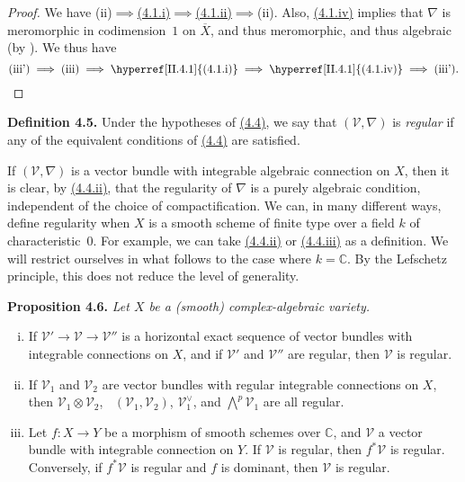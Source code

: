 \documentclass{report}
\newenvironment{itenv}[1]
  {\phantomsection\par\medskip\noindent\textbf{#1.}\itshape}
  {\par\medskip}
\newenvironment{rmenv}[1]
  {\phantomsection\par\medskip\noindent\textbf{#1.}\rmfamily}
  {\par\medskip}
\renewcommand{\cal}[1]{{\mathcal{#1}}}
\newcommand{\CC}{\mathbb{C}}
\DeclareMathOperator{\shHom}{\underline{Hom}}
\begin{document}
\begin{proof}
  We have \mbox{(ii)$\implies$\hyperref[II.4.1]{(4.1.i)}$\implies$\hyperref[II.4.1]{(4.1.ii)}$\implies$(ii)}.
  Also, \hyperref[II.4.1]{(4.1.iv)} implies that $\nabla$ is meromorphic in codimension~$1$ on $\overline{X}$, and thus meromorphic, and thus algebraic (by \cite{GAGA}).
  We thus have
  \[
    \mbox{(iii')}
    \implies \mbox{(iii)}
    \implies \mbox{\hyperref[II.4.1]{(4.1.i)}}
    \implies \mbox{\hyperref[II.4.1]{(4.1.iv)}}
    \implies \mbox{(iii')}.
  \]
\end{proof}

\begin{rmenv}{Definition 4.5}
\label{II.4.5}
  Under the hypotheses of \hyperref[II.4.4]{(4.4)}, we say that $(\cal{V},\nabla)$ is \emph{regular} if any of the equivalent conditions of \hyperref[II.4.4]{(4.4)} are satisfied.
\end{rmenv}

If $(\cal{V},\nabla)$ is a vector bundle with integrable algebraic connection on $X$, then it is clear, by \hyperref[II.4.4]{(4.4.ii)}, that the regularity of $\nabla$ is a purely algebraic condition, independent of the choice of compactification.
We can, in many different ways, define regularity when $X$ is a smooth scheme of finite type over a field $k$ of characteristic~$0$.
For example, we can take \hyperref[II.4.4]{(4.4.ii)} or \hyperref[II.4.4]{(4.4.iii)} as a definition.
We will restrict ourselves in what follows to the case where $k=\CC$.
By the Lefschetz principle, this does not reduce the level of generality.

\begin{itenv}{Proposition 4.6}
\label{II.4.6}
  Let $X$ be a (smooth) complex-algebraic variety.
  \begin{enumerate}[(i)]
    \item If $\cal{V}'\to\cal{V}\to\cal{V}''$ is a horizontal exact sequence of vector bundles with integrable connections on $X$, and if $\cal{V}'$ and $\cal{V}''$ are regular, then $\cal{V}$ is regular.
    \item If $\cal{V}_1$ and $\cal{V}_2$ are vector bundles with regular integrable connections on $X$, then $\cal{V}_1\otimes\cal{V}_2$, $\shHom(\cal{V}_1,\cal{V}_2)$, $\cal{V}_1^\vee$, and $\bigwedge^p\cal{V}_1$ are all regular.
    \item Let $f\colon X\to Y$ be a morphism of smooth schemes over $\CC$, and $\cal{V}$ a vector bundle with integrable connection on $Y$.
      If $\cal{V}$ is regular, then $f^*\cal{V}$ is regular.
      Conversely, if $f^*\cal{V}$ is regular and $f$ is dominant, then $\cal{V}$ is regular.
  \end{enumerate}
\end{itenv}
\end{document}
